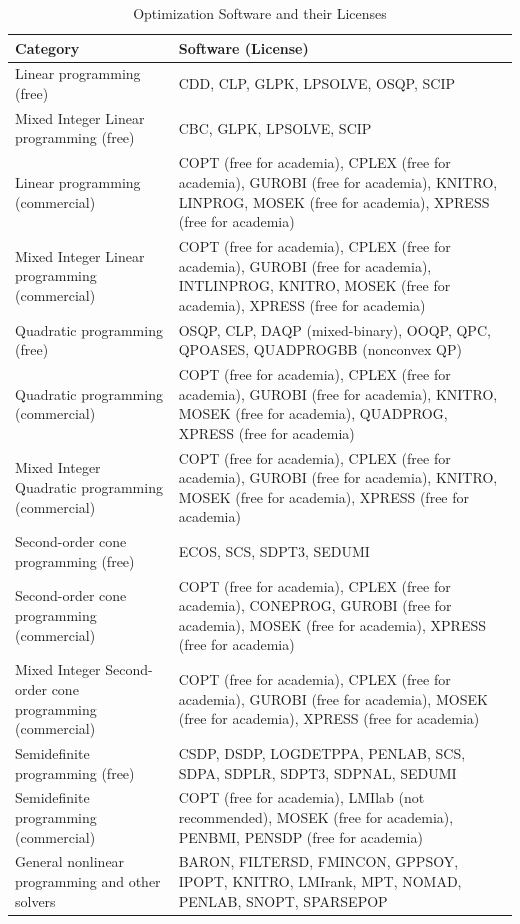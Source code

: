 \begin{table}[H]
\centering
\begin{tabular}{lp{10cm}}
\hline
\textbf{Category} & \textbf{Software (License)} \\ \hline
Linear programming (free) & CDD, CLP, GLPK, LPSOLVE, OSQP, SCIP \\[0.5em]
Mixed Integer Linear programming (free) & CBC, GLPK, LPSOLVE, SCIP \\[0.5em]
Linear programming (commercial) & COPT (free for academia), CPLEX (free for academia), GUROBI (free for academia), KNITRO, LINPROG, MOSEK (free for academia), XPRESS (free for academia) \\[0.5em]
Mixed Integer Linear programming (commercial) & COPT (free for academia), CPLEX (free for academia), GUROBI (free for academia), INTLINPROG, KNITRO, MOSEK (free for academia), XPRESS (free for academia) \\[0.5em]
Quadratic programming (free) & OSQP, CLP, DAQP (mixed-binary), OOQP, QPC, QPOASES, QUADPROGBB (nonconvex QP) \\[0.5em]
Quadratic programming (commercial) & COPT (free for academia), CPLEX (free for academia), GUROBI (free for academia), KNITRO, MOSEK (free for academia), QUADPROG, XPRESS (free for academia) \\[0.5em]
Mixed Integer Quadratic programming (commercial) & COPT (free for academia), CPLEX (free for academia), GUROBI (free for academia), KNITRO, MOSEK (free for academia), XPRESS (free for academia) \\[0.5em]
Second-order cone programming (free) & ECOS, SCS, SDPT3, SEDUMI \\[0.5em]
Second-order cone programming (commercial) & COPT (free for academia), CPLEX (free for academia), CONEPROG, GUROBI (free for academia), MOSEK (free for academia), XPRESS (free for academia) \\[0.5em]
Mixed Integer Second-order cone programming (commercial) & COPT (free for academia), CPLEX (free for academia), GUROBI (free for academia), MOSEK (free for academia), XPRESS (free for academia) \\[0.5em]
Semidefinite programming (free) & CSDP, DSDP, LOGDETPPA, PENLAB, SCS, SDPA, SDPLR, SDPT3, SDPNAL, SEDUMI \\[0.5em]
Semidefinite programming (commercial) & COPT (free for academia), LMIlab (not recommended), MOSEK (free for academia), PENBMI, PENSDP (free for academia) \\[0.5em]
General nonlinear programming and other solvers & BARON, FILTERSD, FMINCON, GPPSOY, IPOPT, KNITRO, LMIrank, MPT, NOMAD, PENLAB, SNOPT, SPARSEPOP \\ \hline
\end{tabular}
\caption{Optimization Software and their Licenses}
\label{tab:optimization_software_appendix}
\end{table}

